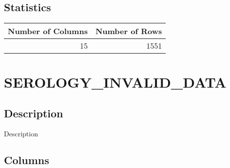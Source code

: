 \documentclass[
  letterpaper,
  DIV=11,
  numbers=noendperiod]{scrreprt}
\begin{document}
\hypertarget{statistics-36}{%
\section*{Statistics}\label{statistics-36}}

\begin{longtable}{rr}
\toprule
Number of Columns & Number of Rows \\ 
\midrule
15 & 1551 \\ 
\bottomrule
\end{longtable}

\hypertarget{serology_invalid_data}{%
\chapter*{SEROLOGY\_INVALID\_DATA}\label{serology_invalid_data}}

\hypertarget{description-37}{%
\section*{Description}\label{description-37}}

Description

\hypertarget{columns-37}{%
\section*{Columns}\label{columns-37}}
\end{document}
